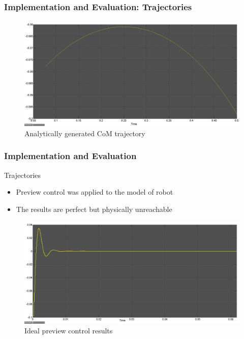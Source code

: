 \documentclass{beamer}
\begin{document}
	\begin{frame}
		\frametitle{Implementation and Evaluation: Trajectories}
		\begin{figure}[h!]
			\centering
			\includegraphics[width=\linewidth]{presentation_images/27}
			\caption{Analytically generated CoM trajectory}
		\end{figure}
	\end{frame}
	

	\begin{frame}
		\frametitle{Implementation and Evaluation}
		\begin{block}{Trajectories}
			\begin{itemize}
				\item
					Preview control was applied to the model of robot
				\item
					The results are perfect but physically unreachable
			\end{itemize}
		\end{block}
		
		\begin{figure}[h!]
			\centering
			\includegraphics[width=0.68\linewidth]{presentation_images/28}
			\caption{Ideal preview control results}
		\end{figure}
	\end{frame}
	
\end{document}
